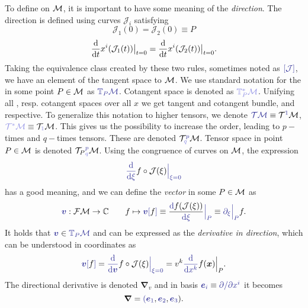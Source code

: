 To define  on $\mathcal{M}$, it is important to have some meaning of the \emph{direction}. The direction is defined using curves $\mathcal J_i$ satisfying 
$$\mathcal J_1(0)=\mathcal J_2(0)\equiv P$$
$$\frac{\mathrm{d} }{\mathrm{d} t}x^i(\mathcal J_1(t))\big|_{t=0}=\frac{\mathrm{d} }{\mathrm{d} t}x^i(\mathcal J_2(t))\big|_{t=0}.$$
Taking the equivalence class created by these two rules, sometimes noted as $\bluee{[\mathcal J]}$, we have an element of the tangent space to $\mathcal{M}$. We use standard notation for the  in some point $P\in\mathcal{M}$ as $\bluee{\T_P\M}$. Cotangent space is denoted as $\blueee{\T^*_P\M}$. Unifying all , resp. cotangent spaces over all $x$ we get tangent and cotangent bundle, \bluee{$\TT\M$} and \blueee{$\TT^*\M$} respective. To generalize this notation to higher tensors, we denote $\bluee{\TT\M}\equiv\TT^{\bluee{1}}\M$, $\blueee{\TT^*\M}\equiv \TT_{\blueee{1}}\M$. This gives us the possibility to increase the order, leading to $p-$times  and $q-$times  tensors. These are denoted $\TT^{\bluee p}_{\blueee q} \M$. Tensor space in point $P\in\mathcal{M}$ is denoted ${\TT_P}^{\bluee p}_{\blueee q} \M$.
Using the congruence of curves on $\mathcal{M}$, the expression 
\begin{equation}
    \bluee{\der{}{\xi}}f\circ \mathcal J(\xi)\bluee{\Big|_{\xi=0}}
\end{equation}
has a good meaning, and we can define the \emph{vector} in some $P\in\mathcal{M}$ as
\begin{equation}
    \bluee{\bm v}: \FM\rightarrow \C \qquad f\mapsto \bluee{\bm v[}f\bluee ]\equiv \frac{\bluee \d f(\mathcal J(\xi))}{\bluee{\d \xi}}\bluee{\Big|_P} \equiv \bluee{\partial_\xi\Big|_P} f .
\end{equation}
It holds that $\bluee{\bm v}\in \bluee{\T_P\M}$ and can be expressed as the \emph{derivative in direction},
which can be understood in coordinates as
\begin{equation}
    \bluee{\bm v[}f\bluee ] = \bluee{\der{}{\bm v}} f\circ \mathcal J(\xi)\bluee{\Big|_{\xi=0}}=v^k\bluee{\der{}{x^k}} f(\bm x)\Big|_{P}.
\end{equation}
The directional derivative is denoted $\bm\nabla_v$
and in basis $\bluee{\bm e_i} \equiv \bluee{\partial/\partial x^i}$ it becomes
$$\bm\nabla=\bluee(\bluee{\bm e_1}, \bluee{\bm e_2},\bluee{\bm e_3}).$$


